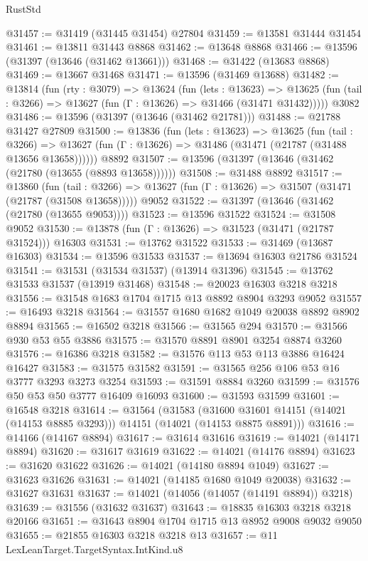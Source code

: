 \begin{lexlean}{RustStd}
\begin{coremodule}
@31457 := @31419 (@31445 @31454) @27804
@31459 := @13581 @31444 @31454
@31461 := @13811 @31443 @8868
@31462 := @13648 @8868
@31466 := @13596 (@31397 (@13646 (@31462 @13661)))
@31468 := @31422 (@13683 @8868)
@31469 := @13667 @31468
@31471 := @13596 (@31469 @13688)
@31482 := @13814
    (fun (rty : @3079) =>
    @13624
      (fun (lets : @13623) =>
      @13625 (fun (tail : @3266) => @13627 (fun (Γ : @13626) => @31466 (@31471 @31432)))))
    @3082
@31486 := @13596 (@31397 (@13646 (@31462 @21781)))
@31488 := @21788 @31427 @27809
@31500 := @13836
    (fun (lets : @13623) =>
    @13625
      (fun (tail : @3266) =>
      @13627 (fun (Γ : @13626) => @31486 (@31471 (@21787 (@31488 @13656 @13658))))))
    @8892
@31507 := @13596 (@31397 (@13646 (@31462 (@21780 (@13655 (@8893 @13658))))))
@31508 := @31488 @8892
@31517 := @13860
    (fun (tail : @3266) => @13627 (fun (Γ : @13626) => @31507 (@31471 (@21787 (@31508 @13658)))))
    @9052
@31522 := @31397 (@13646 (@31462 (@21780 (@13655 @9053))))
@31523 := @13596 @31522
@31524 := @31508 @9052
@31530 := @13878 (fun (Γ : @13626) => @31523 (@31471 (@21787 @31524))) @16303
@31531 := @13762 @31522
@31533 := @31469 (@13687 @16303)
@31534 := @13596 @31533
@31537 := @13694 @16303 @21786 @31524
@31541 := @31531 (@31534 @31537) (@13914 @31396)
@31545 := @13762 @31533 @31537 (@13919 @31468)
@31548 := @20023 @16303 @3218 @3218
@31556 := @31548 @1683 @1704 @1715 @13 @8892 @8904 @3293 @9052
@31557 := @16493 @3218
@31564 := @31557 @1680 @1682 @1049 @20038 @8892 @8902 @8894
@31565 := @16502 @3218
@31566 := @31565 @294
@31570 := @31566 @930 @53 @55 @3886
@31575 := @31570 @8891 @8901 @3254 @8874 @3260
@31576 := @16386 @3218
@31582 := @31576 @113 @53 @113 @3886 @16424 @16427
@31583 := @31575 @31582
@31591 := @31565 @256 @106 @53 @16 @3777 @3293 @3273 @3254
@31593 := @31591 @8884 @3260
@31599 := @31576 @50 @53 @50 @3777 @16409 @16093
@31600 := @31593 @31599
@31601 := @16548 @3218
@31614 := @31564
    (@31583
      (@31600 @31601 @14151 (@14021 (@14153 @8885 @3293)))
      @14151
      (@14021 (@14153 @8875 @8891)))
@31616 := @14166 (@14167 @8894)
@31617 := @31614 @31616
@31619 := @14021 (@14171 @8894)
@31620 := @31617 @31619
@31622 := @14021 (@14176 @8894)
@31623 := @31620 @31622
@31626 := @14021 (@14180 @8894 @1049)
@31627 := @31623 @31626
@31631 := @14021 (@14185 @1680 @1049 @20038)
@31632 := @31627 @31631
@31637 := @14021 (@14056 (@14057 (@14191 @8894)) @3218)
@31639 := @31556 (@31632 @31637)
@31643 := @18835 @16303 @3218 @3218 @20166
@31651 := @31643 @8904 @1704 @1715 @13 @8952 @9008 @9032 @9050
@31655 := @21855 @16303 @3218 @3218 @13
@31657 := @11 LexLeanTarget.TargetSyntax.IntKind.u8

\end{coremodule}
\end{lexlean}
